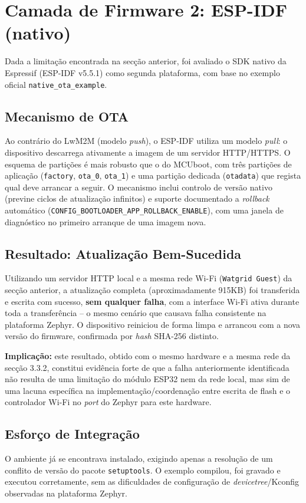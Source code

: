 \documentclass[a4paper,12pt]{article}
\begin{document}
\section{Camada de Firmware 2: ESP-IDF (nativo)}
Dada a limitação encontrada na secção anterior, foi avaliado o SDK nativo da Espressif (ESP-IDF v5.5.1) como segunda plataforma, com base no exemplo oficial \texttt{native\_ota\_example}.

\subsection{Mecanismo de OTA}
Ao contrário do LwM2M (modelo \textit{push}), o ESP-IDF utiliza um modelo \textit{pull}: o dispositivo descarrega ativamente a imagem de um servidor HTTP/HTTPS. O esquema de partições é mais robusto que o do MCUboot, com três partições de aplicação (\texttt{factory}, \texttt{ota\_0}, \texttt{ota\_1}) e uma partição dedicada (\texttt{otadata}) que regista qual deve arrancar a seguir. O mecanismo inclui controlo de versão nativo (previne ciclos de atualização infinitos) e suporte documentado a \textit{rollback} automático (\texttt{CONFIG\_BOOTLOADER\_APP\_ROLLBACK\_ENABLE}), com uma janela de diagnóstico no primeiro arranque de uma imagem nova.

\subsection{Resultado: Atualização Bem-Sucedida}
Utilizando um servidor HTTP local e a mesma rede Wi-Fi (\texttt{Watgrid Guest}) da secção anterior, a atualização completa (aproximadamente 915KB) foi transferida e escrita com sucesso, \textbf{sem qualquer falha}, com a interface Wi-Fi ativa durante toda a transferência -- o mesmo cenário que causava falha consistente na plataforma Zephyr. O dispositivo reiniciou de forma limpa e arrancou com a nova versão do firmware, confirmada por \textit{hash} SHA-256 distinto.

\textbf{Implicação:} este resultado, obtido com o mesmo hardware e a mesma rede da secção 3.3.2, constitui evidência forte de que a falha anteriormente identificada não resulta de uma limitação do módulo ESP32 nem da rede local, mas sim de uma lacuna específica na implementação/coordenação entre escrita de flash e o controlador Wi-Fi no \textit{port} do Zephyr para este hardware.

\subsection{Esforço de Integração}
O ambiente já se encontrava instalado, exigindo apenas a resolução de um conflito de versão do pacote \texttt{setuptools}. O exemplo compilou, foi gravado e executou corretamente, sem as dificuldades de configuração de \textit{devicetree}/Kconfig observadas na plataforma Zephyr.
\end{document}

